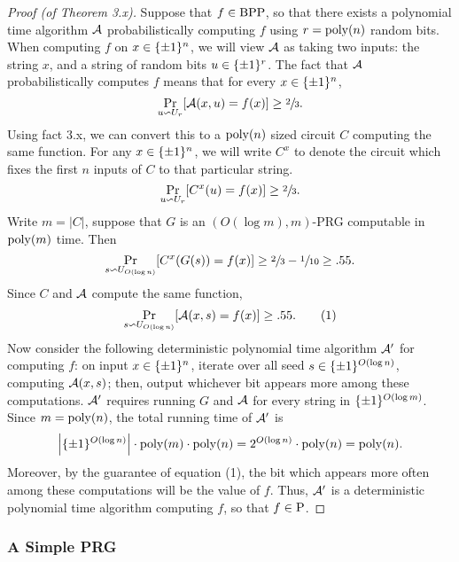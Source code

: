 \documentclass[11pt]{article}
\begin{document}
\begin{proof}[Proof \textup{(of Theorem 3.x)}] Suppose that $f \in \BPP$, so that there exists a polynomial time algorithm $\cA$ probabilistically computing $f$ using $r = \poly(n)$ random bits. When computing $f$ on $x \in \pmon$, we will view $\cA$ as taking two inputs: the string $x$, and a string of random bits $u \in \pmo^{r}$. The fact that $\cA$ probabilistically computes $f$ means that for every $x \in \pmon$, 
\begin{equation*}
    \Pr_{u \backsim U_r}[\cA(x, u) = f(x)] \geq \sfrac{2}{3}. 
\end{equation*}
Using fact 3.x, we can convert this to a $\poly(n)$ sized circuit $C$ computing the same function. For any $x \in \pmon$, we will write $C^x$ to denote the circuit which fixes the first $n$ inputs of $C$ to that particular string.
\begin{equation*}
    \Pr_{u \backsim U_r}[C^{x}(u) = f(x)] \geq \sfrac{2}{3}. 
\end{equation*}
Write $m = |C|$, suppose that $G$ is an $(O(\log m), m)$-PRG computable in $\poly(m)$ time. Then 
\begin{equation*}
    \Pr_{s \backsim U_{O(\log n)}}[C^{x}(G(s)) = f(x)] \geq \sfrac{2}{3} - \sfrac{1}{10} \geq .55.
\end{equation*}
Since $C$ and $\cA$ compute the same function, 
\begin{equation*}
    \Pr_{s \backsim U_{O(\log n)}}[\cA(x, s) = f(x)] \geq  .55. \tag{1}
\end{equation*}
Now consider the following deterministic polynomial time algorithm $\cA'$ for computing $f$: on input $x \in \pmon$, iterate over all seed $s \in \pmo^{O(\log n)}$, computing $\cA(x, s)$; then, output whichever bit appears more among these computations. $\cA'$ requires running $G$ and $\cA$ for every string in $\pmo^{O(\log m)}$. Since $m = \poly(n)$, the total running time of $\cA'$ is 
\begin{equation*}
    \left|\pmo^{O(\log n)}\right| \cdot \poly(m) \cdot \poly(n) = 2^{O(\log n)} \cdot \poly(n) = \poly(n).
\end{equation*}
Moreover, by the guarantee of equation (1), the bit which appears more often among these computations will be the value of $f$. Thus, $\cA'$ is a deterministic polynomial time algorithm computing $f$, so that $f \in \P$.
\end{proof}

\subsubsection{A Simple PRG}
\end{document}
